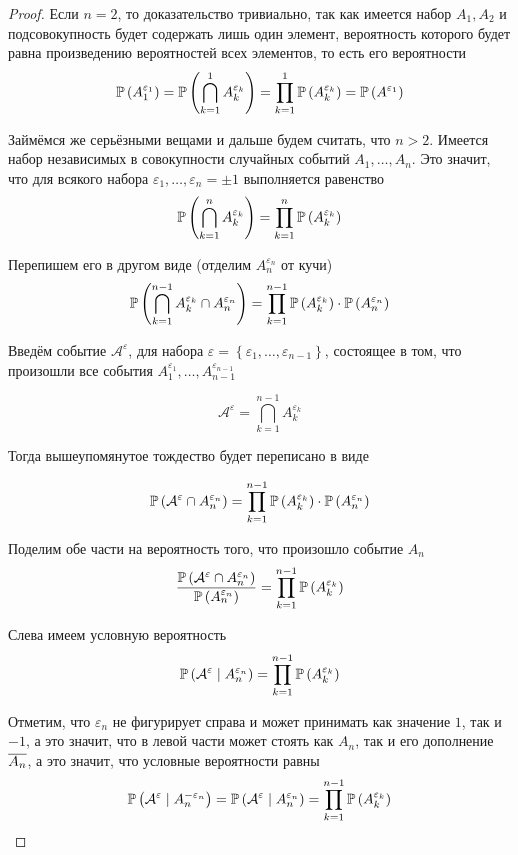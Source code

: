 \begin{proof}
    Если $n=2$, то доказательство тривиально, так как имеется набор $A_1, A_2$
    и подсовокупность будет содержать лишь один элемент,
    вероятность которого будет равна произведению вероятностей всех элементов,
    то есть его вероятности
    $$\mathbb{P}\left( A_1^{\varepsilon_1} \right)
    =\mathbb{P}\left( \bigcap_{k=1}^{1} A_{k}^{\varepsilon_k} \right)
    =\prod_{k=1}^{1} \mathbb{P}\left( A_{k}^{\varepsilon_k} \right)
    =\mathbb{P}\left( A^{\varepsilon_1} \right)$$

    Займёмся же серьёзными вещами и дальше будем считать, что $n>2$.
    Имеется набор независимых в совокупности случайных событий
    $A_1, \dots, A_n$. Это значит,
    что для всякого набора $\varepsilon_1, \dots, \varepsilon_n=\pm 1$
    выполняется равенство
    $$\mathbb{P}\left( \bigcap_{k=1}^n A_{k}^{\varepsilon_k} \right)
    =\prod_{k=1}^n \mathbb{P}\left( A_{k}^{\varepsilon_k} \right)$$

    Перепишем его в другом виде (отделим $A_n^{\varepsilon_n}$ от кучи)
    $$\mathbb{P}\left( \bigcap_{k=1}^{n-1} A_{k}^{\varepsilon_k}
        \cap A_n^{\varepsilon_n} \right)
    =\prod_{k=1}^{n-1} \mathbb{P}\left( A_{k}^{\varepsilon_k} \right)
        \cdot \mathbb{P}\left( A_n^{\varepsilon_n} \right)$$

    Введём событие $\mathcal{A}^{\varepsilon}$,
    для набора
    $\varepsilon=\left\{\varepsilon_1, \dots, \varepsilon_{n-1}\right\}$,
    состоящее в том,
    что произошли все события
    $A_1^{\varepsilon_1}, \dots, A_{n-1}^{\varepsilon_{n-1}}$

    $$\mathcal{A^{\varepsilon}}=\bigcap_{k=1}^{n-1} A_{k}^{\varepsilon_k}$$

    Тогда вышеупомянутое тождество будет переписано в виде

    $$\mathbb{P}\left( \mathcal{A}^{\varepsilon} \cap A_n^{\varepsilon_n} \right)
    =\prod_{k=1}^{n-1} \mathbb{P}\left( A_{k}^{\varepsilon_k} \right)
        \cdot \mathbb{P}\left( A_n^{\varepsilon_n} \right)$$

    Поделим обе части на вероятность того, что произошло событие $A_n$
    $$\frac{\mathbb{P}\left( \mathcal{A}^{\varepsilon}\cap A_n^{\varepsilon_n} \right)}
        {\mathbb{P}\left( A_n^{\varepsilon_n} \right)}
    =\prod_{k=1}^{n-1} \mathbb{P}\left( A_{k}^{\varepsilon_k} \right)$$

    Слева имеем условную вероятность
    $$\mathbb{P}\left( \mathcal{A}^{\varepsilon}\mid A_n^{\varepsilon_n} \right)
    =\prod_{k=1}^{n-1} \mathbb{P}\left( A_{k}^{\varepsilon_k} \right)$$

    Отметим, что $\varepsilon_n$ не фигурирует справа и может принимать как
    значение $1$, так и $-1$, а это значит, что в левой части может стоять как
    $A_n$, так и его дополнение $\overline{A_n}$, а это значит, что условные
    вероятности равны
    \begin{equation}\label{eq:equal_conditional_probabilities}
        \mathbb{P}\left( \mathcal{A}^{\varepsilon}\mid A_n^{-\varepsilon_n} \right)
        =\mathbb{P}\left( \mathcal{A}^{\varepsilon}\mid A_n^{\varepsilon_n} \right)
        =\prod_{k=1}^{n-1} \mathbb{P}\left( A_{k}^{\varepsilon_k} \right)
    \end{equation}


\end{proof}
